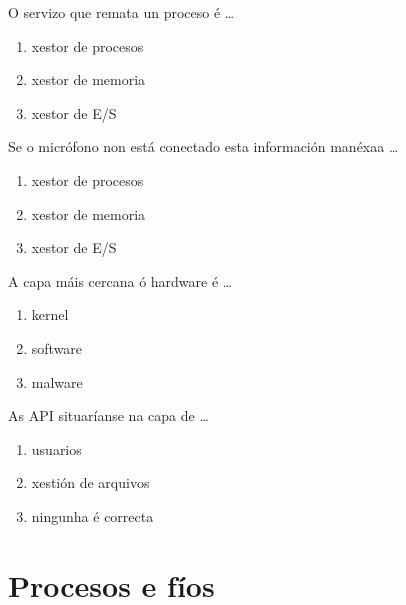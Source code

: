 \begin{diapo} \begin{frame}{O servizo que remata un proceso é   \dots} 
\begin{enumerate}
	\item xestor de procesos\pause
	\item xestor de memoria \pause
	\item xestor de E/S 
\end{enumerate} \end{frame}  \end{diapo}  
\begin{diapo}\begin{frame}{ Se o micrófono non está conectado esta información manéxaa   \dots}
\begin{enumerate}
	\item xestor de procesos\pause
	\item xestor de memoria \pause
	\item xestor de E/S 
\end{enumerate} \end{frame} \end{diapo}

\begin{diapo} \begin{frame}{ A capa máis cercana ó hardware é  \dots} 
\begin{enumerate}
	\item kernel\pause
	\item software \pause
	\item malware 
\end{enumerate} \end{frame}  \end{diapo}  
\begin{diapo}\begin{frame}{ As API situaríanse na capa de   \dots}
\begin{enumerate}
	\item usuarios \pause
	\item xestión de arquivos \pause
	\item ningunha é correcta 
\end{enumerate} \end{frame} \end{diapo}



%
\section{Procesos e fíos}


